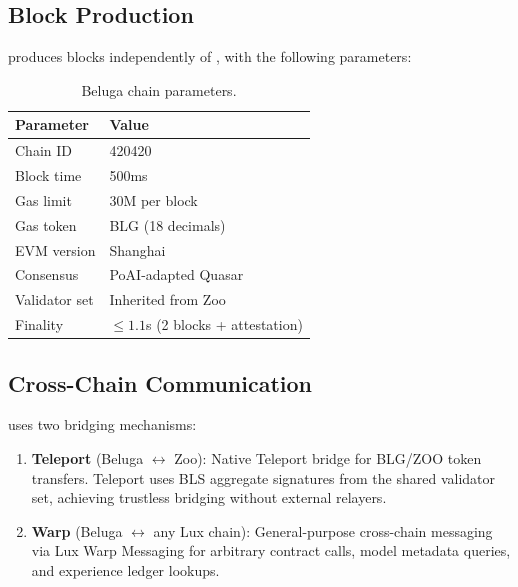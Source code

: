 \subsection{Block Production}

\Beluga{} produces blocks independently of \Zoo{}, with the following parameters:

\begin{table}[h]
\centering
\caption{Beluga chain parameters.}
\label{tab:params}
\begin{tabular}{@{}ll@{}}
\toprule
Parameter & Value \\
\midrule
Chain ID & 420420 \\
Block time & 500ms \\
Gas limit & 30M per block \\
Gas token & BLG (18 decimals) \\
EVM version & Shanghai \\
Consensus & PoAI-adapted Quasar \\
Validator set & Inherited from Zoo \\
Finality & $\leq 1.1$s (2 blocks + attestation) \\
\bottomrule
\end{tabular}
\end{table}

\subsection{Cross-Chain Communication}

\Beluga{} uses two bridging mechanisms:

\begin{enumerate}
    \item \textbf{Teleport} (Beluga $\leftrightarrow$ Zoo): Native \Lux{} Teleport bridge \cite{lux-teleport} for BLG/ZOO token transfers. Teleport uses BLS aggregate signatures from the shared validator set, achieving trustless bridging without external relayers.
    \item \textbf{Warp} (Beluga $\leftrightarrow$ any Lux chain): General-purpose cross-chain messaging via Lux Warp Messaging for arbitrary contract calls, model metadata queries, and experience ledger lookups.
\end{enumerate}

